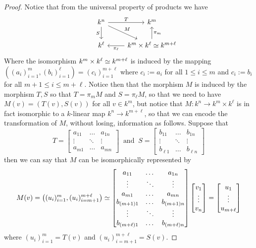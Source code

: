 \begin{proof}
  Notice that from the universal property of products we have
  \[
    \begin{tikzcd}
       &k^n \ar["T", r] \ar["M", dr] \ar[swap, "S", d] &k^m \\
       &k^\ell &k^m \times k^\ell \iso k^{m+\ell} \ar["\pi_\ell", l]
       \ar[swap, "\pi_m", u]
    \end{tikzcd}
  \]
  Where the isomorphism \(k^m \times k^\ell \simeq k^{m+\ell}\) is induced by the
  mapping  \(((a_i)_{i=1}^m, (b_i)_{i=1}^\ell) = (c_i)_{i=1}^{m+\ell}\) where
  \(c_i := a_i\) for all \(1 \leq i \leq m\) and \(c_i := b_i\) for all  \(m+1
  \leq i \leq m+\ell\). Notice then that the morphism \(M\) is induced by the
  morphism \(T, S\) so that \(T = \pi_m  M\) and \(S = \pi_\ell  M\),
  so that we need to have \(M(v) = (T(v), S(v))\) for all \(v \in k^m\), but
  notice that \(M : k^n \to k^m\times k^\ell\) is in fact isomorphic to a
  \(k\)-linear map \(k^n \to k^{m+\ell}\), so that we can encode the
  transformation of \(M\), without losing, information as follows. Suppose that
  \[
    T =
    \begin{bmatrix}
      a_{11} &\dots &a_{1n} \\
      \vdots &\ddots &\vdots \\
      a_{m1} &\dots & a_{mn}
    \end{bmatrix}
    \ \text{ and }\
    S =
    \begin{bmatrix}
      b_{11} &\dots &b_{1n} \\
      \vdots &\ddots &\vdots \\
      b_{\ell 1} &\dots & b_{\ell n}
    \end{bmatrix}
  \]
  then we can say that \(M\) can be isomorphically represented by
  \[
    M(v) = \left((u_i)_{i=1}^m, (u_i)_{i=m+1}^{m+\ell} \right) \simeq
    \begin{bmatrix}
      a_{11} &\dots &a_{1n} \\
      \vdots &\ddots &\vdots \\
      a_{m1} &\dots & a_{mn} \\
      b_{(m+1) 1} &\dots &b_{(m+1) n} \\
      \vdots &\ddots &\vdots \\
      b_{(m+\ell) 1} &\dots & b_{(m+\ell) n}
    \end{bmatrix}
    \begin{bmatrix}
      v_1 \\ \vdots \\ v_n
    \end{bmatrix}
    =
    \begin{bmatrix} u_1 \\ \vdots \\ u_{m+\ell} \end{bmatrix}
  \]
  where \((u_i)_{i=1}^m = T(v) \) and \((u_i)_{i=m+1}^{m+\ell} = S(v)\).
\end{proof}

